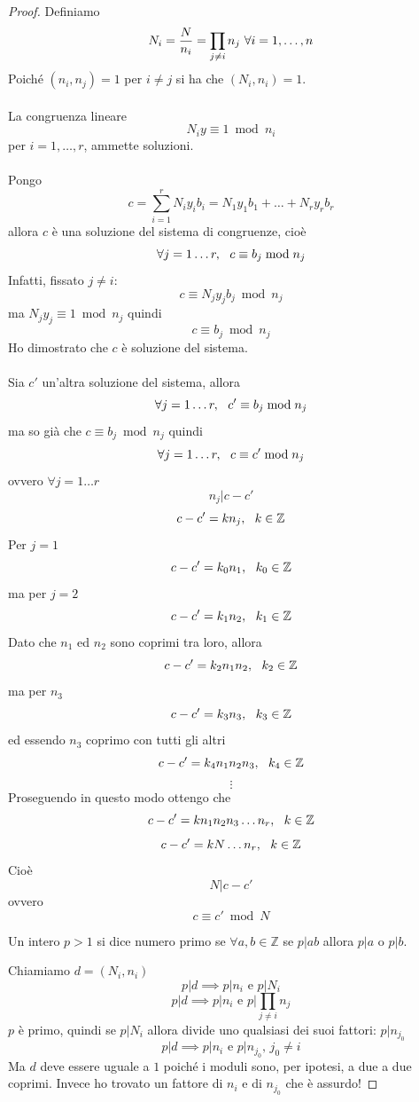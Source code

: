 \documentclass[a4paper,12pt, oneside]{book}
\begin{document}
\begin{teorema}
	\begin{proof}
		Definiamo $$N_i = \frac{N}{n_i} = \prod_{j \not = i} n_j \mbox{\space} \forall i=1,\dots,n$$
		Poiché $(n_i, n_j) = 1$ per $i \not = j$ si ha che $(N_i, n_i) = 1$.\\\\
		La congruenza lineare $$N_i y \equiv 1 \bmod n_i$$ per $i = 1, \dots, r$, ammette soluzioni.\\\\
		Pongo $$c = \sum_{i = 1}^{r} N_iy_ib_i = N_1y_1b_1 + \dots + N_ry_rb_r$$
		allora $c$ è una soluzione del sistema di congruenze, cioè
		$$\forall j = 1 \dots r, \mbox{\space \space} c \equiv b_j \bmod n_j$$
		Infatti, fissato $j \not = i$: $$c \equiv N_jy_jb_j \bmod n_j$$
		ma $N_jy_j \equiv 1 \bmod n_j$ quindi $$c \equiv b_j \bmod n_j$$
		Ho dimostrato che $c$ è soluzione del sistema.\\\\
		Sia $c'$ un'altra soluzione del sistema, allora
		$$\forall j = 1 \dots r, \mbox{\space \space} c' \equiv b_j \bmod n_j$$
		ma so già che $c \equiv b_j \bmod n_j$ quindi
		$$\forall j = 1 \dots r, \mbox{\space \space} c \equiv c' \bmod n_j$$
		ovvero $\forall j = 1 \dots r$
		$$n_j | c-c'$$
		$$c-c' = k n_j, \mbox{\space \space } k \in \mathbb{Z}$$
		Per $j=1$
		$$c-c' = k_0 n_1, \mbox{\space \space } k_0 \in \mathbb{Z}$$
		ma per $j=2$
		$$c-c' = k_1 n_2, \mbox{\space \space } k_1 \in \mathbb{Z}$$
		Dato che $n_1$ ed $n_2$ sono coprimi tra loro, allora
		$$c-c' = k_2 n_1 n_2, \mbox{\space \space } k_2 \in \mathbb{Z}$$
		ma per $n_3$
		$$c-c' = k_3 n_3, \mbox{\space \space } k_3 \in \mathbb{Z}$$
		ed essendo $n_3$ coprimo con tutti gli altri
		$$c-c' = k_4 n_1 n_2 n_3, \mbox{\space \space } k_4 \in \mathbb{Z}$$
		$$\vdots$$
		Proseguendo in questo modo ottengo che
		$$c-c' = k n_1 n_2 n_3 \dots n_r, \mbox{\space \space } k \in \mathbb{Z}$$
		$$c-c' = k N \dots n_r, \mbox{\space \space } k \in \mathbb{Z}$$
		Cioè
		$$N | c - c'$$
		ovvero
		$$c \equiv c' \bmod N$$
		\begin{shaded}
			\begin{definizione}
				Un intero $p > 1$ si dice numero primo se $\forall a,b \in \mathbb{Z}$ se $p|ab$ allora $p|a$ o $p|b$.
			\end{definizione}
		\end{shaded}
		Chiamiamo $d = (N_i, n_i)$
		$$p|d \implies p|n_i \mbox{ e } p|N_i$$
		$$p|d \implies p|n_i \mbox{ e } p|\prod_{j \not = i} n_j$$
		$p$ è primo, quindi se $p|N_i$ allora divide uno qualsiasi dei suoi fattori: $p|n_{j_0}$
		$$p|d \implies p|n_i \mbox{ e } p|n_{j_0} \mbox{, } j_0 \not = i$$
		Ma $d$ deve essere uguale a $1$ poiché i moduli sono, per ipotesi, a due a due coprimi. Invece ho trovato un fattore di $n_i$ e di $n_{j_0}$ che è assurdo!
	\end{proof}
\end{teorema}
\end{document}
